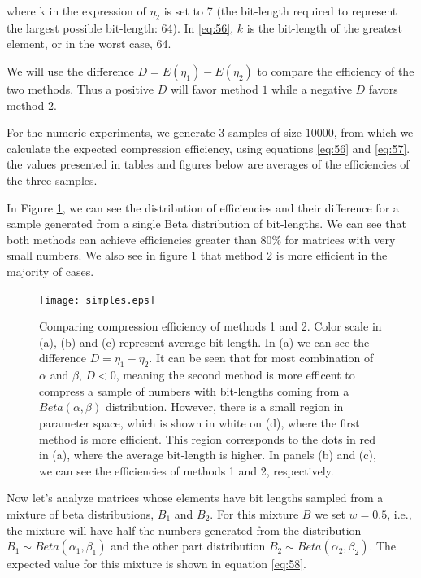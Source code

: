 \documentclass[10pt]{article}
\begin{document}
where k in the expression of $\eta_2$ is set to 7 (the bit-length required to represent the largest possible bit-length: 64). In \ref{eq:56}, $k$ is the bit-length of the greatest element, or in the worst case, 64.

We will use the difference $D=E(\eta_1)-E(\eta_2)$ to compare the efficiency of the two methods. Thus a positive $D$ will favor method $1$ while a negative $D$ favors method $2$.

For the numeric experiments, we generate $3$ samples of size $10000$, from which we calculate the expected compression efficiency, using equations \ref{eq:56} and \ref{eq:57}. the values presented in tables and figures below are averages of the efficiencies of the three samples. 
 
In Figure \ref{fig:03}, we can see the distribution of efficiencies and their difference for a sample generated from a single Beta distribution of bit-lengths. We can see that both methods can achieve efficiencies greater than 80\% for matrices with very small numbers. We also see in figure \ref{fig:03} that method 2 is more efficient in the majority of cases.
 
\begin{figure}[h]
  \centering
  \texttt{[image: simples.eps]}
  \caption{Comparing compression efficiency of methods 1 and 2. Color scale in (a), (b) and (c) represent average bit-length. In (a) we can see the difference $D = \eta_1 - \eta_2$. It can be seen that for most combination of $\alpha$ and $\beta$, $D<0$, meaning the second method is more efficent to compress a sample of numbers with bit-lengths coming from a $Beta(\alpha,\beta)$ distribution. However, there is a small region in parameter space, which is shown in white on (d), where the first method is more efficient. This region corresponds to the dots in red in (a), where the average bit-length is higher. In panels (b) and (c), we can see the efficiencies of methods 1 and 2, respectively.}
  \label{fig:03}
\end{figure}
 
Now let's analyze matrices whose elements have bit lengths sampled from a mixture of beta distributions, $B_1$ and $B_2$. For this mixture $B$ we set $w = 0.5$, i.e., the mixture will have half the numbers generated from the distribution $B_1 \sim Beta(\alpha_1,\beta_1)$ and the other part distribution $B_2 \sim Beta(\alpha_2,\beta_2)$. The expected value for this mixture is shown in equation \ref{eq:58}.
 
\end{document}
